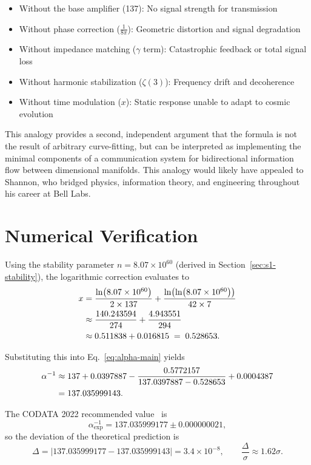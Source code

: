 \documentclass[pdflatex,sn-mathphys-num]{sn-jnl}
\theoremstyle{thmstyleone}
\theoremstyle{thmstyletwo}
\theoremstyle{thmstylethree}
\begin{document}
\begin{itemize}
    \item Without the base amplifier (137): No signal strength for transmission
    \item Without phase correction ($\frac{1}{8\pi}$): Geometric distortion and signal degradation
    \item Without impedance matching ($\gamma$ term): Catastrophic feedback or total signal loss
    \item Without harmonic stabilization ($\zeta(3)$): Frequency drift and decoherence
    \item Without time modulation ($x$): Static response unable to adapt to cosmic evolution
\end{itemize}

This analogy provides a second, independent argument that the formula is not the result of arbitrary curve-fitting, but can be interpreted as implementing the minimal components of a communication system for bidirectional information flow between dimensional manifolds. This analogy would likely have appealed to Shannon, who bridged physics, information theory, and engineering throughout his career at Bell Labs.
\section{Numerical Verification}\label{sec:s1-numerical}

Using the stability parameter $n = 8.07 \times 10^{60}$ (derived in Section~\ref{sec:s1-stability}), 
the logarithmic correction evaluates to
\begin{align}
x &= \frac{\ln(8.07 \times 10^{60})}{2 \times 137} + \frac{\ln(\ln(8.07 \times 10^{60}))}{42 \times 7} \notag \\
  &\approx \frac{140.243594}{274} + \frac{4.943551}{294} \notag \\
  &\approx 0.511838 + 0.016815 \;=\; 0.528653.
\end{align}

Substituting this into Eq.~\eqref{eq:alpha-main} yields
\begin{align}
\alpha^{-1} &\approx 137 + 0.0397887 
 - \frac{0.5772157}{137.0397887 - 0.528653} 
 + 0.0004387 \notag \\
&= 137.035999143.
\end{align}

The CODATA 2022 recommended value~\cite{nistcodata2022} is
\[
\alpha^{-1}_{\text{exp}} = 137.035999177 \pm 0.000000021,
\]
so the deviation of the theoretical prediction is
\[
\Delta = |137.035999177 - 137.035999143| = 3.4 \times 10^{-8},
\qquad \frac{\Delta}{\sigma} \approx 1.62\sigma.
\]
\end{document}
